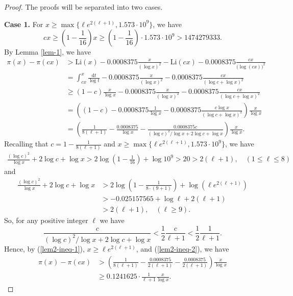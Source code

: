 \documentclass[12pt,a4paper,reqno]{amsart}
\numberwithin{equation}{section}
\def\Li{{\mathrm{Li}}}
\def\d{{\mathrm{d}}}
\theoremstyle{plain}
\theoremstyle{definition}
\begin{document}
 \begin{proof}
 The proofs will be separated into two cases.
 	
 	\textbf{Case 1.}
 	For $x\geq \max\{\ell e^{2(\ell+1)},1.573\cdot 10^{9}\}$, we have 
 	$$
 	cx\geq \left( 1-\frac{1}{16} \right)x\geq \left( 1- \frac{1}{16}\right)\cdot 1.573\cdot 10^{9} > 1474279333.
 	$$
 	By Lemma \ref{lem-1}, we have
 	\begin{align}\label{lem2-ineq-1}
 		\pi(x)-\pi(cx)
 		&> \Li(x)-0.0008375\frac{x}{(\log x)^{2}}-\Li(cx)-0.0008375\frac{cx}{\big(\log (cx)\big)^{2}}\nonumber\\
 		&=\int_{cx}^{x}\frac{\d t}{\log t}-0.0008375\frac{x}{(\log x)^{2}}-0.0008375\frac{cx}{(\log c+\log x )^{2}}\nonumber\\
 		&\geq (1-c)\frac{x}{\log x}-0.0008375\frac{x}{(\log x)^{2}}-0.0008375\frac{cx}{(\log c+\log x)^{2}}\nonumber\\
 		&= \left( (1-c)-0.0008375\frac{1}{\log x}-0.0008375 \frac{c\log x}{(\log c+\log x)^{2}}\right)\frac{x}{\log x}\nonumber\\
 		&= \left( \frac{1}{8(\ell+1)}-\frac{0.0008375}{\log x}-\frac{0.0008375 c}{(\log c)^{2}/\log x+2\log c+\log x}\right)\frac{x}{\log x}.
 	\end{align}
 	Recalling that $c=1-\frac{1}{8(\ell+1)}$ and $x\geq \max\{\ell e^{2(\ell+1)},1.573\cdot 10^{9}\}$, we have 
 	\begin{align*}
 		\frac{(\log c)^{2}}{ \log x}+2\log c+ \log x
 		>2\log\left(1-\frac{1}{16}\right)+\log 10^{9}
 		>20
 		> 2 (\ell+1), \quad (1\leq \ell \leq 8)
 	\end{align*}
 	and
 	\begin{align*}
 		\frac{(\log c)^{2}}{\log x}+2\log c+ \log x 
 		&> 2\log \left(1-\frac{1}{8\cdot (9+1)}\right)+\log\left( \ell e^{2(\ell+1)} \right)\\
 		&>-0.025157565 +\log \ell+2(\ell+1)\\
 		&>2(\ell+1), \quad (\ell\geq 9).
 	\end{align*}
 	So, for any positive integer $\ell$ we have
 	\begin{equation}\label{lem2-ineq-2}
 		\frac{c}{(\log c)^{2}/\log x+2\log c+\log x}< \frac{1}{2} \frac{c}{ \ell+1}<\frac{1}{2}\frac{1}{\ell+1}.
 	\end{equation}
 	Hence, by (\ref{lem2-ineq-1}), $x\geq \ell e^{2(\ell+1)}$, and (\ref{lem2-ineq-2}), we have
 	\begin{align*}
 		\pi(x)-\pi(cx)
 		&> \left(\frac{1}{8(\ell+1)}-\frac{0.0008375}{2(\ell+1)}-\frac{0.0008375}{2(\ell+1)}\right)\frac{x}{\log x}\\
 		&\geq 0.1241625 \cdot \frac{1}{\ell+1}\frac{x}{\log x}.
 	\end{align*}
 	

\end{proof}
\end{document}
